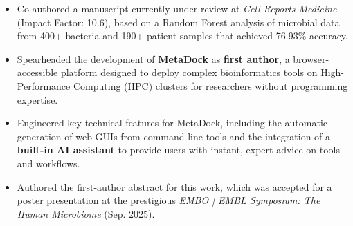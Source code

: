 \documentclass{resume}
\begin{document}
\begin{itemize}
  \item Co-authored a manuscript currently under review at \textit{Cell Reports Medicine} (Impact Factor: 10.6), based on a Random Forest analysis of microbial data from 400+ bacteria and 190+ patient samples that achieved 76.93\% accuracy.
  \item Spearheaded the development of \textbf{MetaDock} as \textbf{first author}, a browser-accessible platform designed to deploy complex bioinformatics tools on High-Performance Computing (HPC) clusters for researchers without programming expertise.
  \item Engineered key technical features for MetaDock, including the automatic generation of web GUIs from command-line tools and the integration of a \textbf{built-in AI assistant} to provide users with instant, expert advice on tools and workflows.
  \item Authored the first-author abstract for this work, which was accepted for a poster presentation at the prestigious \textit{EMBO | EMBL Symposium: The Human Microbiome} (Sep. 2025).
\end{itemize}


\end{document}
